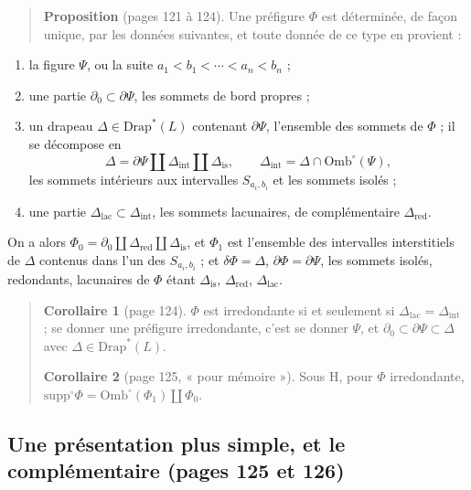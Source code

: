 \documentclass[11pt,a4paper]{article}
\begin{document}
\begin{quote}
\textbf{Proposition} (pages 121 à 124). Une préfigure $\Phi$ est déterminée, de
façon unique, par les données suivantes, et toute donnée de ce type en provient :
\end{quote}
\begin{enumerate}
\item[1°)] la figure $\Psi$, ou la suite $a_{1} < b_{1} < \cdots < a_{n} <
b_{n}$ ;
\item[2°)] une partie $\partial_{0} \subset \partial\Psi$, les sommets de bord
propres ;
\item[3°)] un drapeau $\Delta \in \mathrm{Drap}^{*}(L)$ contenant
$\partial\Psi$, l'ensemble des sommets de $\Phi$ ; il se décompose en
\[
\Delta = \partial\Psi \amalg \Delta_{\mathrm{int}} \amalg \Delta_{\mathrm{is}},
\qquad \Delta_{\mathrm{int}} = \Delta \cap \mathrm{Omb}^{\circ}(\Psi),
\]
les sommets intérieurs aux intervalles $S_{a_{i},b_{i}}$ et les sommets
isolés ;
\item[4°)] une partie $\Delta_{\mathrm{lac}} \subset \Delta_{\mathrm{int}}$, les
sommets lacunaires, de complémentaire $\Delta_{\mathrm{red}}$.
\end{enumerate}
On a alors $\Phi_{0} = \partial_{0} \amalg \Delta_{\mathrm{red}} \amalg
\Delta_{\mathrm{is}}$, et $\Phi_{1}$ est l'ensemble des intervalles
interstitiels de $\Delta$ contenus dans l'un des $S_{a_{i}, b_{i}}$ ; et
$\delta\Phi = \Delta$, $\partial\Phi = \partial\Psi$, les sommets isolés,
redondants, lacunaires de $\Phi$ étant $\Delta_{\mathrm{is}}$,
$\Delta_{\mathrm{red}}$, $\Delta_{\mathrm{lac}}$.


\begin{quote}
\textbf{Corollaire 1} (page 124). $\Phi$ est irredondante si et seulement si
$\Delta_{\mathrm{lac}} = \Delta_{\mathrm{int}}$ ; se donner une préfigure
irredondante, c'est se donner $\Psi$, et $\partial_{0} \subset \partial\Psi
\subset \Delta$ avec $\Delta \in \mathrm{Drap}^{*}(L)$.

\textbf{Corollaire 2} (page 125, « pour mémoire »). Sous H, pour $\Phi$
irredondante, $\mathrm{supp}^{\circ}\Phi = \mathrm{Omb}^{\circ}(\Phi_{1}) \amalg
\Phi_{0}$.
\end{quote}

\subsection*{Une présentation plus simple, et le complémentaire (pages 125 et 126)}
\end{document}
